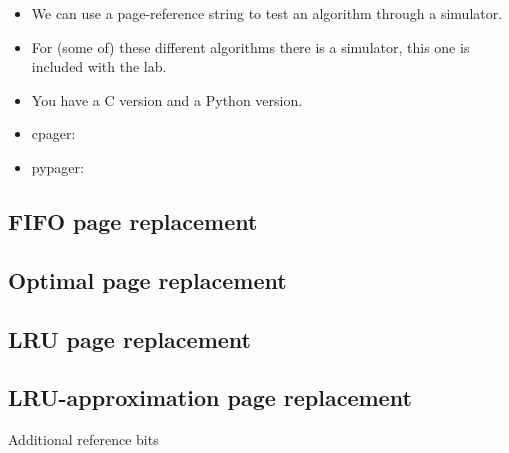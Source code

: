 \documentclass{beamer}
\begin{document}
\begin{frame}{\insertsubsectionhead}
  \begin{itemize}
    \item We can use a page-reference string to test an algorithm through 
      a simulator.

    \item For (some of) these different algorithms there is a simulator, this 
      one is included with the lab.

    \item You have a C version and a Python version.

    \item cpager: 

    \item pypager: 

  \end{itemize}
\end{frame}

\subsection{FIFO page replacement}

\begin{frame}{\insertsubsectionhead}
\end{frame}

\subsection{Optimal page replacement}

\begin{frame}{\insertsubsectionhead}
\end{frame}

\subsection{LRU page replacement}

\begin{frame}{\insertsubsectionhead}
\end{frame}

\subsection{LRU-approximation page replacement}

\begin{frame}{\insertsubsectionhead}{Additional reference bits}
\end{frame}
\end{document}
